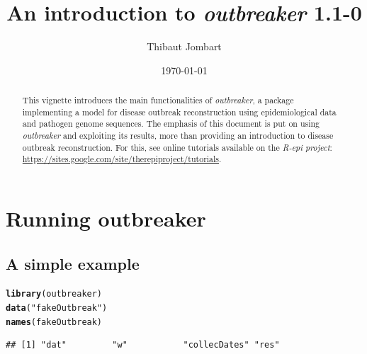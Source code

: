 \documentclass{article}\usepackage[]{graphicx}\usepackage[]{color}
\title{An introduction to \textit{outbreaker} 1.1-0}
\author{Thibaut Jombart}
\date{\today}
\makeatletter
\newcommand{\hlstr}[1]{\textcolor[rgb]{0.192,0.494,0.8}{#1}}%
\newcommand{\hlstd}[1]{\textcolor[rgb]{0.345,0.345,0.345}{#1}}%
\newcommand{\hlkwd}[1]{\textcolor[rgb]{0.737,0.353,0.396}{\textbf{#1}}}%
\newenvironment{kframe}{%
 \def\at@end@of@kframe{}%
 \ifinner\ifhmode%
  \def\at@end@of@kframe{\end{minipage}}%
  \begin{minipage}{\columnwidth}%
 \fi\fi%
 \def\FrameCommand##1{\hskip\@totalleftmargin \hskip-\fboxsep
 \colorbox{shadecolor}{##1}\hskip-\fboxsep
     \hskip-\linewidth \hskip-\@totalleftmargin \hskip\columnwidth}%
 \MakeFramed {\advance\hsize-\width
   \@totalleftmargin\z@ \linewidth\hsize
   \@setminipage}}%
 {\par\unskip\endMakeFramed%
 \at@end@of@kframe}
\newenvironment{knitrout}{}{} %
\makeatother
\begin{document}
\color{black}

\maketitle

\begin{abstract}
  This vignette introduces the main functionalities of \textit{outbreaker}, a package implementing a
  model for disease outbreak reconstruction using epidemiological data and pathogen genome
  sequences. The emphasis of this document is put on using \textit{outbreaker} and exploiting its
  results, more than providing an introduction to disease outbreak reconstruction. For this, see
  online tutorials available on the \textit{R-epi project}:
  \url{https://sites.google.com/site/therepiproject/tutorials}.
\end{abstract}

\newpage

\tableofcontents





\section{Running outbreaker}


\subsection{A simple example}

\begin{knitrout}
\color{fgcolor}\begin{kframe}
\begin{alltt}
\hlkwd{library}\hlstd{(outbreaker)}
\hlkwd{data}\hlstd{(}\hlstr{"fakeOutbreak"}\hlstd{)}
\hlkwd{names}\hlstd{(fakeOutbreak)}
\end{alltt}
\begin{verbatim}
## [1] "dat"         "w"           "collecDates" "res"
\end{verbatim}
\end{kframe}
\end{knitrout}
\end{document}

